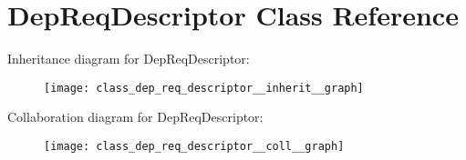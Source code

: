 \hypertarget{class_dep_req_descriptor}{}\section{Dep\+Req\+Descriptor Class Reference}
\label{class_dep_req_descriptor}


Inheritance diagram for Dep\+Req\+Descriptor\+:\nopagebreak
\begin{figure}[H]
\begin{center}
\leavevmode
\texttt{[image: class\_dep\_req\_descriptor\_\_inherit\_\_graph]}
\end{center}
\end{figure}


Collaboration diagram for Dep\+Req\+Descriptor\+:\nopagebreak
\begin{figure}[H]
\begin{center}
\leavevmode
\texttt{[image: class\_dep\_req\_descriptor\_\_coll\_\_graph]}
\end{center}
\end{figure}

